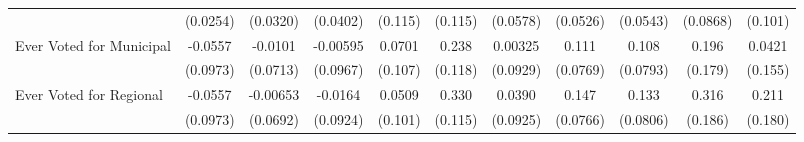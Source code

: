 {\begin{tabular}{l*{10}{c}}
            &    (0.0254)         &    (0.0320)         &    (0.0402)         &     (0.115)         &     (0.115)         &    (0.0578)         &    (0.0526)         &    (0.0543)         &    (0.0868)         &     (0.101)         \\
\addlinespace
Ever Voted for Municipal&     -0.0557         &     -0.0101         &    -0.00595         &      0.0701         &       0.238\sym{*}  &     0.00325         &       0.111         &       0.108         &       0.196         &      0.0421         \\
            &    (0.0973)         &    (0.0713)         &    (0.0967)         &     (0.107)         &     (0.118)         &    (0.0929)         &    (0.0769)         &    (0.0793)         &     (0.179)         &     (0.155)         \\
\addlinespace
Ever Voted for Regional&     -0.0557         &    -0.00653         &     -0.0164         &      0.0509         &       0.330\sym{**} &      0.0390         &       0.147         &       0.133         &       0.316         &       0.211         \\
            &    (0.0973)         &    (0.0692)         &    (0.0924)         &     (0.101)         &     (0.115)         &    (0.0925)         &    (0.0766)         &    (0.0806)         &     (0.186)         &     (0.180)         \\
\bottomrule
\end{tabular}
}
